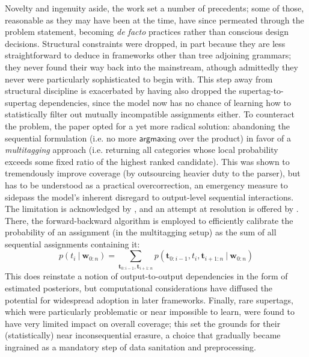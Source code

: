 Novelty and ingenuity aside, the work set a number of precedents; some of those, reasonable as they may have been at the time, have since permeated through the problem statement, becoming \textit{de facto} practices rather than conscious design decisions.
Structural constraints were dropped, in part because they are less straightforward to deduce in frameworks other than tree adjoining grammars; they never found their way back into the mainstream, athough admittedly they never were particularly sophisticated to begin with.
This step away from structural discipline is exacerbated by having also dropped the supertag-to-supertag dependencies, since the model now has no chance of learning how to statistically filter out mutually incompatible assignments either.
To counteract the problem, the paper opted for a yet more radical solution: abandoning the sequential formulation (i.e. no more $\mathsf{argmax}$ing over the product) in favor of a \textit{multitagging} approach (i.e. returning all categories whose local probability exceeds some fixed ratio of the highest ranked candidate).
This was shown to tremendously improve coverage (by outsourcing heavier duty to the parser), but has to be understood as a practical overcorrection, an emergency measure to sidepass the model's inherent disregard to output-level sequential interactions.
The limitation is acknowledged by \citet{clark-curran-2004-importance}, and an attempt at resolution is offered by \citet{curran2006multi}.
There, the forward-backward algorithm is employed to efficiently calibrate the probability of an assignment (in the multitagging setup) as the sum of all sequential assignments containing it:
\begin{equation}
	p(t_i \ | \ \mathbf{w}_{0:n}) = \sum_{\mathbf{t}_{0:i-1}, \mathbf{t}_{i+1:n}} p(\mathbf{t}_{0:i-1}, t_i, \mathbf{t}_{i+1:n} \ | \ \mathbf{w}_{0:n})
\end{equation}
This does reinstate a notion of output-to-output dependencies in the form of estimated posteriors, but computational considerations have diffused the potential for widespread adoption in later frameworks. 
Finally, rare supertags, which were particularly problematic or near impossible to learn, were found to have very limited impact on overall coverage; this set the grounds for their (statistically) near inconsequential erasure, a choice that gradually became ingrained as a mandatory step of data sanitation and preprocessing.


